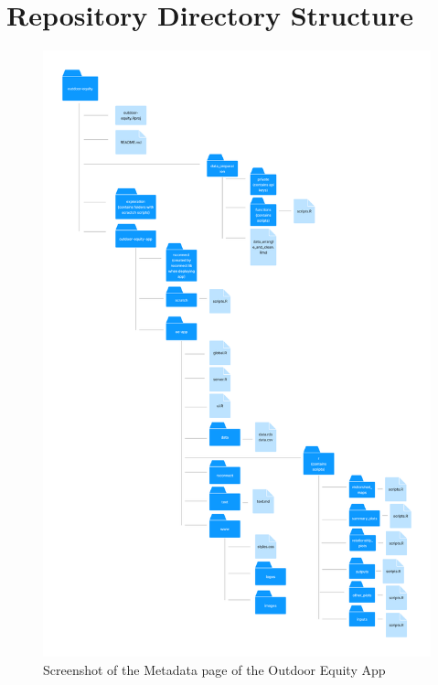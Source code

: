 \documentclass[
  11 pt,
  openany]{book}
\begin{document}
\newpage

\hypertarget{repository-directory-structure-1}{%
\section{Repository Directory Structure}\label{repository-directory-structure-1}}

\begin{figure}
\includegraphics[width=18.73in]{images/repo_directory_medfont} \caption{Screenshot of the Metadata page of the Outdoor Equity App}\label{fig:repo-directory}
\end{figure}

  
\end{document}
